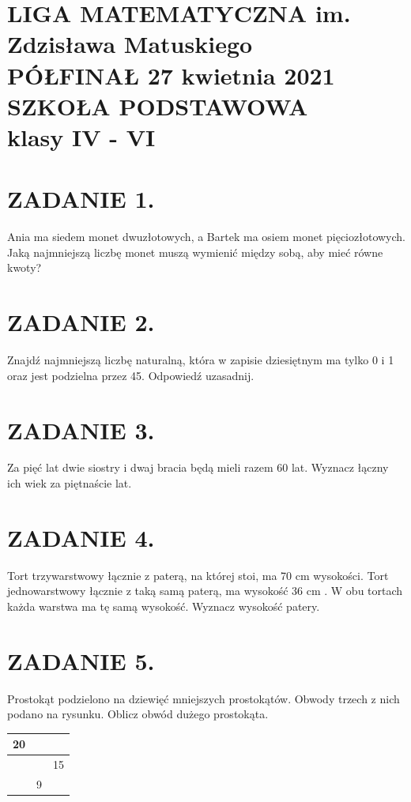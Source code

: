 \documentclass[10pt]{article}
\begin{document}
\section*{LIGA MATEMATYCZNA im. Zdzisława Matuskiego \\
 PÓŁFINAŁ 27 kwietnia 2021 \\
 SZKOŁA PODSTAWOWA \\
 klasy IV - VI}
\section*{ZADANIE 1.}
Ania ma siedem monet dwuzłotowych, a Bartek ma osiem monet pięciozłotowych. Jaką najmniejszą liczbę monet muszą wymienić między sobą, aby mieć równe kwoty?

\section*{ZADANIE 2.}
Znajdź najmniejszą liczbę naturalną, która w zapisie dziesiętnym ma tylko 0 i 1 oraz jest podzielna przez 45. Odpowiedź uzasadnij.

\section*{ZADANIE 3.}
Za pięć lat dwie siostry i dwaj bracia będą mieli razem 60 lat. Wyznacz łączny ich wiek za piętnaście lat.

\section*{ZADANIE 4.}
Tort trzywarstwowy łącznie z paterą, na której stoi, ma 70 cm wysokości. Tort jednowarstwowy łącznie z taką samą paterą, ma wysokość 36 cm . W obu tortach każda warstwa ma tę samą wysokość. Wyznacz wysokość patery.

\section*{ZADANIE 5.}
Prostokąt podzielono na dziewięć mniejszych prostokątów. Obwody trzech z nich podano na rysunku. Oblicz obwód dużego prostokąta.

\begin{center}
\begin{tabular}{|l|l|l|}
\hline
20 &  &  \\
\hline
 &  & 15 \\
\hline
 & 9 &  \\
\hline
\end{tabular}
\end{center}
\end{document}
